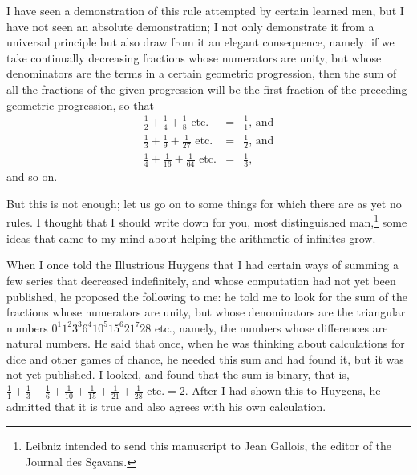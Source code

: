 \documentclass[twoside,openright]{article}
\newlength{\oldjot}
\begin{document}
I have seen a demonstration of this rule attempted by certain learned men, but
I have not seen an absolute demonstration; I not only demonstrate it from a universal principle but
also draw from it
    an elegant consequence, namely: if we take continually decreasing
    fractions whose numerators are unity, but whose denominators are the terms
    in a certain geometric progression, then the sum of all the fractions of
    the given progression will be the first fraction of the preceding
    geometric progression, so that
\setlength{\jot}{2ex}
\begin{eqnarray*}
\frac{1}{2} + \frac{1}{4} + \frac{1}{8} \mbox{ etc.} & = & \frac{1}{1}\mbox{, and}\\
\frac{1}{3} + \frac{1}{9} + \frac{1}{27} \mbox{ etc.} & = & \frac{1}{2}\mbox{, and}\\
\frac{1}{4} + \frac{1}{16} + \frac{1}{64} \mbox{ etc.} &  = & \frac{1}{3},
\end{eqnarray*}
\setlength{\jot}{\oldjot}
 and so on.

But this is not enough; let us go on to some things for which there are as yet
no rules.  I thought that I should write down for you, most distinguished
man,\footnote{Leibniz intended to send this manuscript to Jean Gallois, the editor of the Journal des S\c{c}avans.} some ideas that came to my mind about
helping the arithmetic of infinites grow.

\label{beghar} When I once told the Illustrious Huygens that I had certain ways of summing a
few series that decreased indefinitely, and whose computation had not yet been
published, he proposed the following to me: he told me to look for the sum of
the fractions whose numerators are unity, but whose denominators are the
triangular numbers $0^1 1^2 3^3 6^4 10^5 15^6 21^7 28$ etc., namely, the numbers
whose differences are natural numbers.  He said that once, when he was
thinking about calculations for dice and other games of chance, he needed this
sum and had found it, but it was not yet published.  I looked, and found that
the sum is binary, that is, $\frac{1}{1} + \frac{1}{3} + \frac{1}{6} +
\frac{1}{10} +\frac{1}{15} + \frac{1}{21} +\frac{1}{28} \mbox{ etc.} = 2.$
After I had shown this to Huygens, he admitted that it is true and also agrees
with his own calculation.
\end{document}
